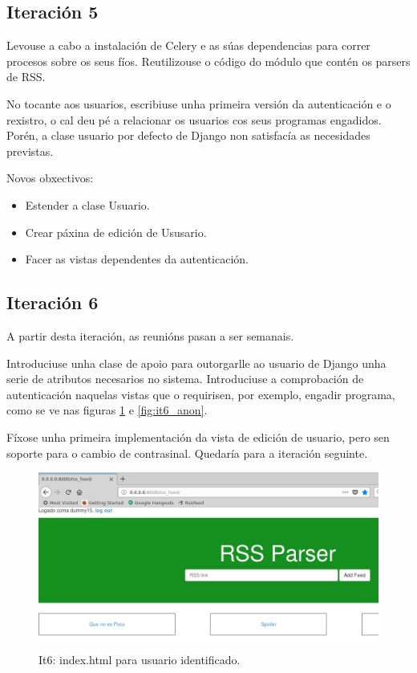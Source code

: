 \subsection{Iteración 5}

Levouse a cabo a instalación de Celery e as súas dependencias para correr procesos sobre os seus fíos. Reutilizouse o código do módulo que contén os parsers de RSS. 

No tocante aos usuarios, escribiuse unha primeira versión da autenticación e o rexistro, o cal deu pé a relacionar os usuarios cos seus programas engadidos. Porén, a clase usuario por defecto de Django non satisfacía as necesidades previstas.

Novos obxectivos:

\begin{itemize}
	\item Estender a clase Usuario.
	\item Crear páxina de edición de Ususario.
	\item Facer as vistas dependentes da autenticación.
\end{itemize}

\subsection{Iteración 6}

A partir desta iteración, as reunións pasan a ser semanais.

Introduciuse unha clase de apoio para outorgarlle ao usuario de Django unha serie de atributos necesarios no sistema. Introduciuse a comprobación de autenticación naquelas vistas que o requirisen, por exemplo, engadir programa, como se ve nas figuras \ref{fig:it6_log} e \ref{fig:it6_anon}.

Fíxose unha primeira implementación da vista de edición de usuario, pero sen soporte para o cambio de contrasinal. Quedaría para a iteración seguinte.

\begin{figure}[h]
	\centering
	\includegraphics[scale=0.4,keepaspectratio=true]{./images/it6_log.png}
	\caption{It6: index.html para usuario identificado.}
	\label{fig:it6_log}
\end{figure}

